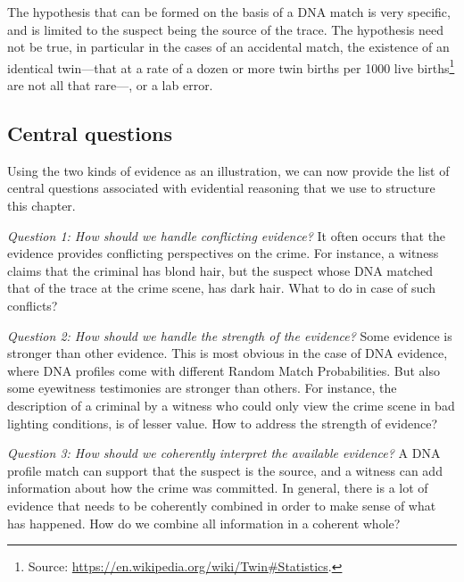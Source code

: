 \documentclass[10pt]{article}
\begin{document}
The hypothesis that can be formed on the basis of a DNA match is very specific, and is limited to the suspect being the source of the trace. The hypothesis need not be true, in particular in the cases of an accidental match, the existence of an identical twin---that at a rate of a dozen or more twin births per 1000 live births\footnote{Source: 
\url{https://en.wikipedia.org/wiki/Twin\#Statistics}.} are not all that rare---, or a lab error. 

\subsection{Central questions}

Using the two kinds of evidence as an illustration, we can now provide the list of central questions associated 
with evidential reasoning that we use to structure this chapter.

\textit{Question 1:	How should we handle conflicting evidence?}
It often occurs that the evidence provides conflicting perspectives on the crime. For instance, a witness claims that the criminal has blond hair, but the suspect whose DNA matched that of the trace at the crime scene, has dark hair. What to do in case of such conflicts?

\textit{Question 2:	How should we handle the strength of the evidence?}
Some evidence is stronger than other evidence. This is most obvious in the case of DNA evidence, where DNA profiles come with different Random Match Probabilities. But also some eyewitness testimonies are stronger than others. For instance, the description of a criminal by a witness who could only view the crime scene in bad lighting conditions, is of lesser value. How to address the strength of evidence?

\textit{Question 3:	How should we coherently interpret the available evidence?}
A DNA profile match can support that the suspect is the source, and a witness can add information about how the crime was committed. In general, there is a lot of evidence that needs to be coherently combined in order to make sense of what has happened. How do we combine all information in a coherent whole?

\end{document}
